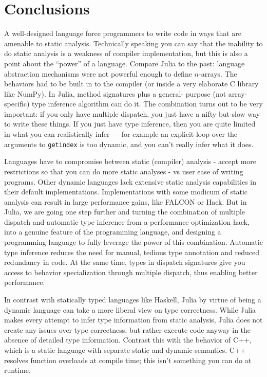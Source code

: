 \documentclass[preprint]{sigplanconf}
\newcommand{\code}[1]{\texttt{#1}}
\begin{document}
\section{Conclusions}

A well-designed language force programmers to write code in ways that are
amenable to static analysis. Technically speaking you can say that the
inability to do static analysis is a weakness of compiler implementation, but
this is also a point about the ``power'' of a language. Compare Julia to the
past: language abstraction mechanisms were not powerful enough to define
$n$-arrays. The behaviors had to be built in to the compiler (or inside a very
elaborate C library like NumPy). In Julia, method signatures plus a general-
purpose (not array-specific) type inference algorithm can do it. The
combination turns out to be very important: if you only have multiple
dispatch, you just have a nifty-but-slow way to write these things. If you
just have type inference, then you are quite limited in what you can
realistically infer --- for example an explicit loop over the arguments to
\code{getindex} is too dynamic, and you can't really infer what it does.

Languages have to compromise between static (compiler) analysis - accept more
restrictions so that you can do more static analyses - vs user ease of writing
programs. Other dynamic languages lack extensive static analysis capabilities
in their default implementations. Implementations with some modicum of static
analysis can result in large performance gains, like FALCON or Hack. But in
Julia, we are going one step further and turning the combination of multiple
dispatch and automatic type inference from a performance optimization hack,
into a genuine feature of the programming language, and designing a
programming language to fully leverage the power of this combination.
Automatic type inference reduces the need for manual, tedious type annotation
and reduced redundancy in code. At the same time, types in dispatch signatures
give you access to behavior specialization through multiple dispatch, thus
enabling better performance.

In contrast with statically typed languages like Haskell, Julia by virtue of
being a dynamic language can take a more liberal view on type correctness.
While Julia makes every attempt to infer type information from static
analysis, Julia does not create any issues over type correctness, but rather
execute code anyway in the absence of detailed type information. Contrast this
with the behavior of C++, which is a static language with separate static and
dynamic semantics. C++ resolves function overloads at compile time; this isn't
something you can do at runtime.
\end{document}
